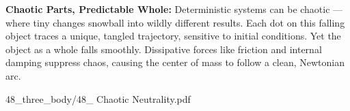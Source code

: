 \begin{SideNotePage}{
  \textbf{Chaotic Parts, Predictable Whole:}  
  Deterministic systems can be chaotic — where tiny changes snowball into wildly different results. Each dot on this falling object traces a unique, tangled trajectory, sensitive to initial conditions. Yet the object as a whole falls smoothly. Dissipative forces like friction and internal damping suppress chaos, causing the center of mass to follow a clean, Newtonian arc. \par
}{48_three_body/48_ Chaotic Neutrality.pdf}
\end{SideNotePage}
